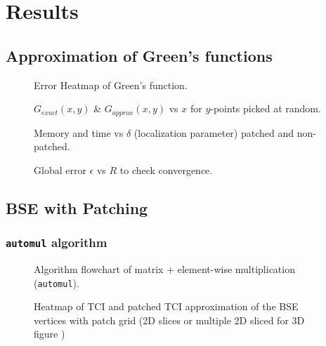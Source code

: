 \chapter{Results}
\label{chap:results}
\section{Approximation of Green's functions}

\begin{figure}[ht!]
    \caption{Error Heatmap of Green's function.}
\end{figure}

\begin{figure}[ht!]
    \caption{$G_{exact}(x,y)$ \& $G_{approx}(x,y)$ vs $x$ for $y$-points picked at random.}
\end{figure}

\begin{figure}[ht!]
    \caption{Memory and time vs $\delta$ (localization parameter) patched and non-patched.}
\end{figure}

\begin{figure}[ht!]
    \caption{Global error $\epsilon$ vs $R$ to check convergence.}
\end{figure}

\section{BSE with Patching}

\subsection{\texttt{automul} algorithm}

\begin{figure}[ht!]
    \caption{Algorithm flowchart of matrix + element-wise multiplication\\(\texttt{automul}).}
\end{figure}

\begin{figure}[ht!]
    \caption{Heatmap of TCI and patched TCI approximation of the BSE vertices with patch grid (2D slices or multiple 2D sliced for 3D figure )}
\end{figure}

